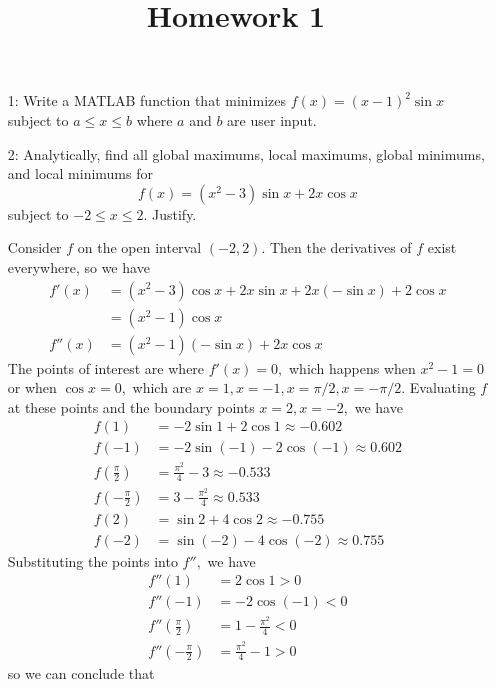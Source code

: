 \documentclass{article}
\begin{document}
\title{Homework 1}
\maketitle
\thispagestyle{fancy}

\begin{itemize}
	\item[1:] Write a MATLAB function that minimizes $f(x)=(x-1)^2\sin x$ subject to $a\le x\le b$ where $a$ and $b$ are user input.

	\item[2:] Analytically, find all global maximums, local maximums, global minimums, and local minimums for \[f(x)=(x^2-3)\sin x+2x\cos x\] subject to $-2\le x\le2.$ Justify.
		\begin{soln}
			Consider $f$ on the open interval $(-2, 2).$ Then the derivatives of $f$ exist everywhere, so we have 
			\begin{align*}
				f'(x) &= (x^2-3)\cos x + 2x\sin x + 2x(-\sin x) + 2\cos x \\
				&= (x^2-1)\cos x \\
				f''(x) &= (x^2-1)(-\sin x) + 2x\cos x
			\end{align*}
			The points of interest are where $f'(x)=0,$ which happens when $x^2-1=0$ or when $\cos x=0,$ which are $x=1, x=-1, x=\pi/2, x=-\pi/2.$ Evaluating $f$ at these points and the boundary points $x=2, x=-2,$ we have
			\begin{align*}
				f(1) &= -2\sin 1+2\cos 1 \approx -0.602\\
				f(-1) &= -2\sin(-1)-2\cos(-1)  \approx 0.602 \\
				f\left( \frac{\pi}{2} \right) &= \frac{\pi^2}{4}-3 \approx -0.533\\
				f\left( -\frac{\pi}{2} \right) &= 3-\frac{\pi^2}{4} \approx 0.533\\
				f(2) &= \sin2 + 4\cos 2 \approx -0.755\\
				f(-2) &= \sin(-2)-4\cos(-2) \approx 0.755
			\end{align*} Substituting the points into $f'',$ we have
			\begin{align*}
				f''(1) &= 2\cos 1 > 0 \\
				f''(-1) &= -2\cos(-1) < 0 \\
				f''\left( \frac{\pi}{2} \right) &= 1-\frac{\pi^2}{4} < 0 \\
				f''\left( -\frac{\pi}{2} \right) &= \frac{\pi^2}{4}-1 > 0
			\end{align*} so we can conclude that
			\begin{center}

\end{center}
\end{soln}
\end{itemize}
\end{document}
